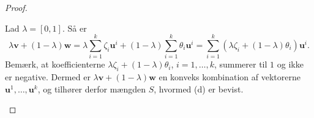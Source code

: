 \begin{proof}
\begin{enumerate}[label=(\alph*)]
	Lad $ \lambda = [0,1]$. 
	Så er $$\lambda \textbf{v} + (1 - \lambda ) \textbf{w} = \lambda \sum_{i=1}^k \zeta_i \textbf{u}^i + (1 - \lambda) \sum_{i=1}^k \theta_i \textbf{u}^i = \sum_{i=1}^k (\lambda \zeta_i + (1-\lambda )\theta_i ) \textbf{u}^i.$$
Bemærk, at koefficienterne $ \lambda \zeta_i + (1 - \lambda) \theta_i$, $i = 1, \ldots, k$, summerer til $1$ og ikke er negative. 
Dermed er $ \lambda \textbf{v} + (1 - \lambda ) \textbf{w}$ en konveks kombination af vektorerne $\textbf{u}^1, \ldots, \textbf{u}^k$, og tilhører derfor mængden $S$, hvormed (d) er bevist. 
\end{enumerate}
\end{proof}